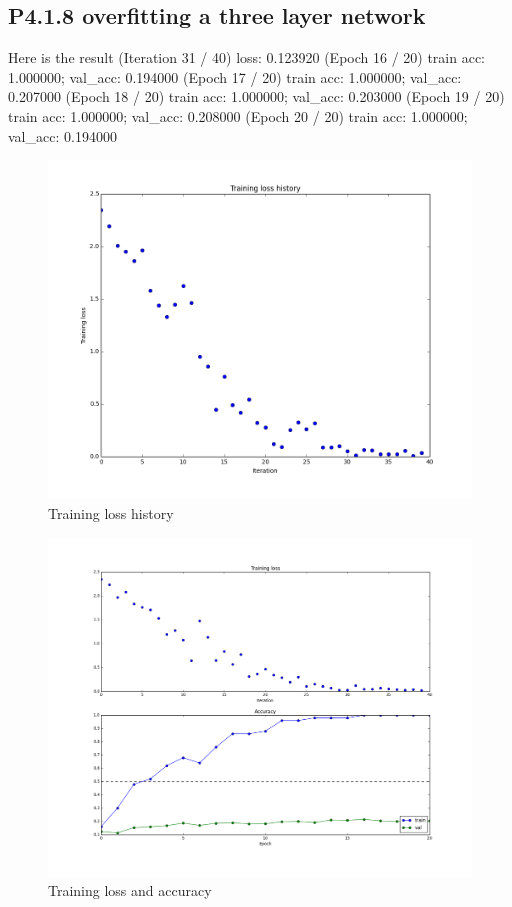 \documentclass[12pt]{article}
\begin{document}
\subsection*{P4.1.8 overfitting a three layer network}
Here is the result
(Iteration 31 / 40) loss: 0.123920
(Epoch 16 / 20) train acc: 1.000000; val\_acc: 0.194000
(Epoch 17 / 20) train acc: 1.000000; val\_acc: 0.207000
(Epoch 18 / 20) train acc: 1.000000; val\_acc: 0.203000
(Epoch 19 / 20) train acc: 1.000000; val\_acc: 0.208000
(Epoch 20 / 20) train acc: 1.000000; val\_acc: 0.194000




\begin{figure}[H]
  \caption{Training loss history}
  \centering
    \includegraphics[scale=0.5]{mltrainingloss.png}
\end{figure}

\begin{figure}[H]
  \caption{Training loss and accuracy}
  \centering
    \includegraphics[scale=0.5]{mltrainingandacc.png}
\end{figure}
\end{document}
